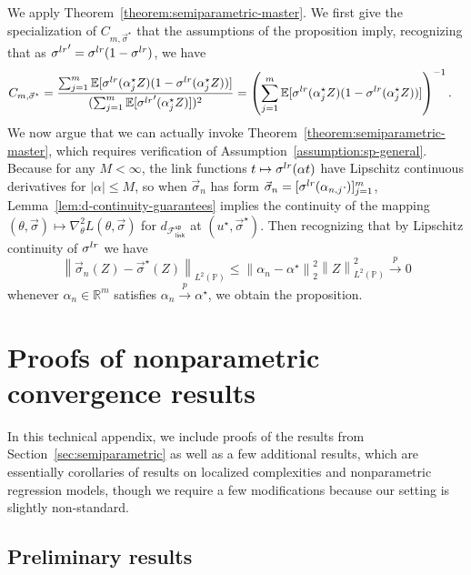 \documentclass[11pt]{article}
\newcommand{\E}{\mathbb{E}}
\newcommand{\Prb}{\mathbb{P}}
\newcommand{\R}{\mathbb{R}} %
\newcommand{\mc}[1]{\mathcal{#1}}
\newcommand{\prn}[1]{\left({#1}\right)} %
\newcommand{\norm}[1]{\left\|{#1}\right\|} %
\newcommand{\lr}{^{\textup{lr}}}
\newcommand{\poploss}{L}
\newcommand{\fsymlinksp}{\mathcal{F}_{\mathsf{link}}^{\mathsf{sp}}}
\newcommand{\ltwo}[1]{\norm{#1}_2} %
\newcommand{\<}{\langle} %
\renewcommand{\>}{\rangle}
\newcommand{\cp}{\stackrel{p}{\rightarrow}}
\newcommand{\LtwoPbold}[1]{\norm{#1}_{L^2(\Prb)}}
\newcommand{\opt}{^\star}
\begin{document}
We apply Theorem~\ref{theorem:semiparametric-master}.
We first give the specialization
of $C_{m,\vec{\sigma}\opt}$ that the assumptions of the proposition
imply, recognizing that as
${\sigma\lr}' = \sigma\lr(1 - \sigma\lr)$, we have
\begin{align*}
  C_{m, \vec{\sigma}\opt} & =
  \frac{\sum_{j = 1}^m
    \E[\sigma\lr(\alpha_j\opt Z) (1 - \sigma\lr(\alpha_j\opt Z))]}{
    (\sum_{j = 1}^m\E[{\sigma\lr}'(\alpha_j\opt Z)])^2}
  = \prn{ \sum_{j = 1}^m \E[\sigma\lr(\alpha_j\opt Z) (1 - \sigma\lr(\alpha_j\opt Z))]}^{-1}.
\end{align*} 
We now argue that we can actually invoke
Theorem~\ref{theorem:semiparametric-master}, which requires verification of
Assumption~\ref{assumption:sp-general}. Because for any $M < \infty$, the
link functions $t \mapsto \sigma\lr(\alpha t)$ have Lipschitz continuous
derivatives for $|\alpha| \le M$, so when $\vec{\sigma}_n$ has form
$\vec{\sigma}_n = [\sigma\lr(\alpha_{n,j}\cdot)]_{j = 1}^m$,
Lemma~\ref{lem:d-continuity-guarantees} implies the continuity of the
mapping $(\theta, \vec{\sigma}) \mapsto \nabla_\theta^2 \poploss(\theta,
\vec{\sigma})$ for $d_{\fsymlinksp}$ at $(u\opt, \vec{\sigma}\opt)$.
Then recognizing that by
Lipschitz continuity of $\sigma\lr$ we have
\begin{equation*}
  \LtwoPbold{\vec{\sigma}_n(Z)
    - \vec{\sigma}\opt(Z)}
  \le \ltwo{\alpha_n - \alpha\opt}^2 \LtwoPbold{Z}^2
  \cp 0
\end{equation*}
whenever $\alpha_n \in \R^m$ satisfies $\alpha_n \cp \alpha\opt$, we
obtain the proposition.

\section{Proofs of nonparametric convergence results}
\label{sec:proof-nonparametric}

\newcommand{\noise}{\xi}
\newcommand{\localcomplexity}{\mc{R}}


In this technical appendix, we include proofs of the results from
Section~\ref{sec:semiparametric} as well as a few additional results, which
are essentially corollaries of results on localized complexities and
nonparametric regression models, though we require a few modifications
because our setting is slightly non-standard.


\subsection{Preliminary results}
\end{document}
